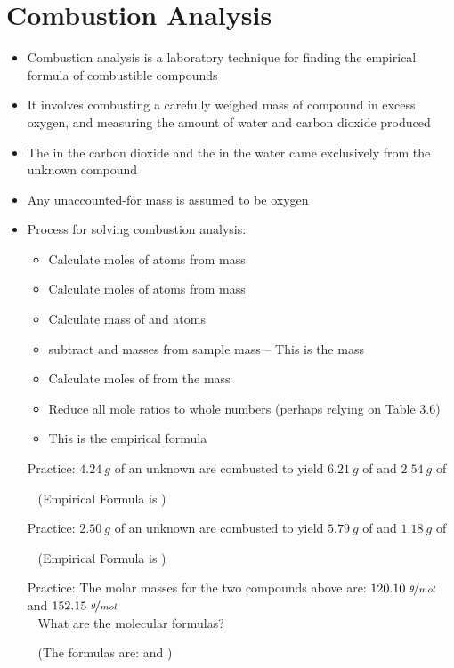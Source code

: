 \documentclass[12pt, openany, letterpaper]{memoir}
\begin{document}
\section{Combustion Analysis}
\begin{itemize}
	\item Combustion analysis is a laboratory technique for finding the empirical formula of combustible compounds
	\item It involves combusting a carefully weighed mass of compound in excess oxygen, and measuring the amount of water and carbon dioxide produced
	\item The  in the carbon dioxide and the  in the water came exclusively from the unknown compound	
	\item Any unaccounted-for mass is assumed to be oxygen
	\item Process for solving combustion analysis:
	\begin{itemize}
		\item Calculate moles of  atoms from  mass
		\item Calculate moles of  atoms from  mass
		\item Calculate mass of  and  atoms
		\item subtract  and  masses from sample mass -- This is the  mass
		\item Calculate moles of  from the  mass
		\item Reduce all mole ratios to whole numbers (perhaps relying on Table 3.6)
		\item This is the empirical formula
	\end{itemize}
	
	Practice: $4.24~g$ of an unknown are combusted to yield $6.21~g$ of  and $2.54~g$ of 
	
	~\hphantom{Practice:} (Empirical Formula is )
	
	Practice: $2.50~g$ of an unknown are combusted to yield $5.79~g$ of  and $1.18~g$ of 
	
	~\hphantom{Practice:} (Empirical Formula is )
	
	Practice: The molar masses for the two compounds above are: $120.10~\nicefrac{g}{mol}$ and $152.15~\nicefrac{g}{mol}$\\
	~\hphantom{Practice: } What are the molecular formulas?
	
	~\hphantom{Practice:} (The formulas are:  and )	
\end{itemize}
\end{document}
